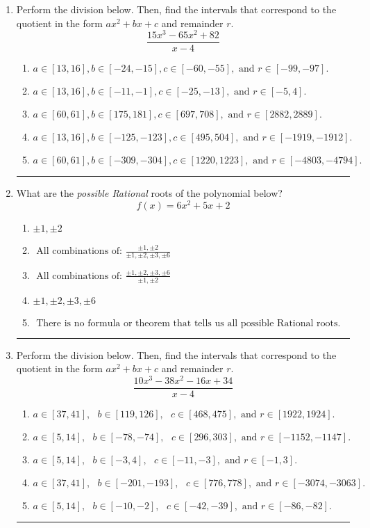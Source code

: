 \documentclass[14pt]{extbook}
\newcommand{\litem}[1]{\item#1\hspace*{-1cm}\rule{\textwidth}{0.4pt}}
\begin{document}
\begin{enumerate}
\litem{
Perform the division below. Then, find the intervals that correspond to the quotient in the form $ax^2+bx+c$ and remainder $r$.\[ \frac{15x^{3} -65 x^{2} + 82}{x -4} \]\begin{enumerate}[label=\Alph*.]
\item \( a \in [13, 16], b \in [-24, -15], c \in [-60, -55], \text{ and } r \in [-99, -97]. \)
\item \( a \in [13, 16], b \in [-11, -1], c \in [-25, -13], \text{ and } r \in [-5, 4]. \)
\item \( a \in [60, 61], b \in [175, 181], c \in [697, 708], \text{ and } r \in [2882, 2889]. \)
\item \( a \in [13, 16], b \in [-125, -123], c \in [495, 504], \text{ and } r \in [-1919, -1912]. \)
\item \( a \in [60, 61], b \in [-309, -304], c \in [1220, 1223], \text{ and } r \in [-4803, -4794]. \)

\end{enumerate} }
\litem{
What are the \textit{possible Rational} roots of the polynomial below?\[ f(x) = 6x^{2} +5 x + 2 \]\begin{enumerate}[label=\Alph*.]
\item \( \pm 1,\pm 2 \)
\item \( \text{ All combinations of: }\frac{\pm 1,\pm 2}{\pm 1,\pm 2,\pm 3,\pm 6} \)
\item \( \text{ All combinations of: }\frac{\pm 1,\pm 2,\pm 3,\pm 6}{\pm 1,\pm 2} \)
\item \( \pm 1,\pm 2,\pm 3,\pm 6 \)
\item \( \text{ There is no formula or theorem that tells us all possible Rational roots.} \)

\end{enumerate} }
\litem{
Perform the division below. Then, find the intervals that correspond to the quotient in the form $ax^2+bx+c$ and remainder $r$.\[ \frac{10x^{3} -38 x^{2} -16 x + 34}{x -4} \]\begin{enumerate}[label=\Alph*.]
\item \( a \in [37, 41], \text{   } b \in [119, 126], \text{   } c \in [468, 475], \text{   and   } r \in [1922, 1924]. \)
\item \( a \in [5, 14], \text{   } b \in [-78, -74], \text{   } c \in [296, 303], \text{   and   } r \in [-1152, -1147]. \)
\item \( a \in [5, 14], \text{   } b \in [-3, 4], \text{   } c \in [-11, -3], \text{   and   } r \in [-1, 3]. \)
\item \( a \in [37, 41], \text{   } b \in [-201, -193], \text{   } c \in [776, 778], \text{   and   } r \in [-3074, -3063]. \)
\item \( a \in [5, 14], \text{   } b \in [-10, -2], \text{   } c \in [-42, -39], \text{   and   } r \in [-86, -82]. \)


\end{enumerate}}
\end{enumerate}
\end{document}

